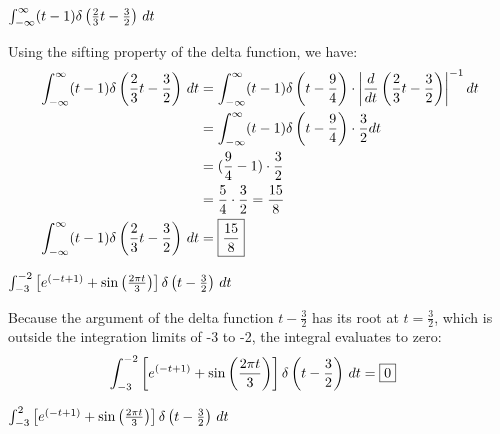 \documentclass[a4paper, 10pt]{article}
\begin{document}
\begin{subproblems}[start=2]
    \item \( \int_{-\infty}^{\infty} (t-1) \delta \left(\frac{2}{3}t- \frac{3}{2} \right) \,dt \)
\end{subproblems}

\begin{solution}
Using the sifting property of the delta function, we have:
\begin{align*}
    \int_{-\infty}^{\infty} (t-1) \delta \left(\frac{2}{3}t- \frac{3}{2} \right) \,dt &= \int_{-\infty}^{\infty} (t-1) \delta \left(t - \frac{9}{4}\right) \cdot \left| \frac{d}{dt} \left( \frac{2}{3}t - \frac{3}{2} \right) \right|^{-1} dt \\
    &= \int_{-\infty}^{\infty} (t-1) \delta \left(t - \frac{9}{4}\right) \cdot \frac{3}{2} dt \\
    &= ( \frac{9}{4} - 1 ) \cdot \frac{3}{2} \\
    &= \frac{5}{4} \cdot \frac{3}{2} = \frac{15}{8} \\
    \int_{-\infty}^{\infty} (t-1) \delta \left(\frac{2}{3}t- \frac{3}{2} \right) \,dt &= \boxed{\frac{15}{8}}
\end{align*}
\end{solution}


\begin{subproblems}[start=3]
    \item \( \int_{-3}^{-2} \left[ e^{(-t+1)} + \sin \left( \frac{2\pi t}{3} \right) \right] \delta \left(t- \frac{3}{2} \right) \,dt \)
\end{subproblems}

\begin{tosubmit}
\par\noindent\submitsolution
Because the argument of the delta function \( t - \frac{3}{2} \) has its root at \( t = \frac{3}{2} \), which is outside the integration limits of -3 to -2, the integral evaluates to zero:
\begin{align*}
    \int_{-3}^{-2} \left[ e^{(-t+1)} + \sin \left( \frac{2\pi t}{3} \right) \right] \delta \left(t- \frac{3}{2} \right) \,dt &= \boxed{0}
\end{align*}
\end{tosubmit}


\begin{subproblems}[start=4]
    \item \( \int_{-3}^{2} \left[ e^{(-t+1)} + \sin \left( \frac{2\pi t}{3} \right) \right] \delta \left(t- \frac{3}{2} \right) \,dt \)
\end{subproblems}
\end{document}
